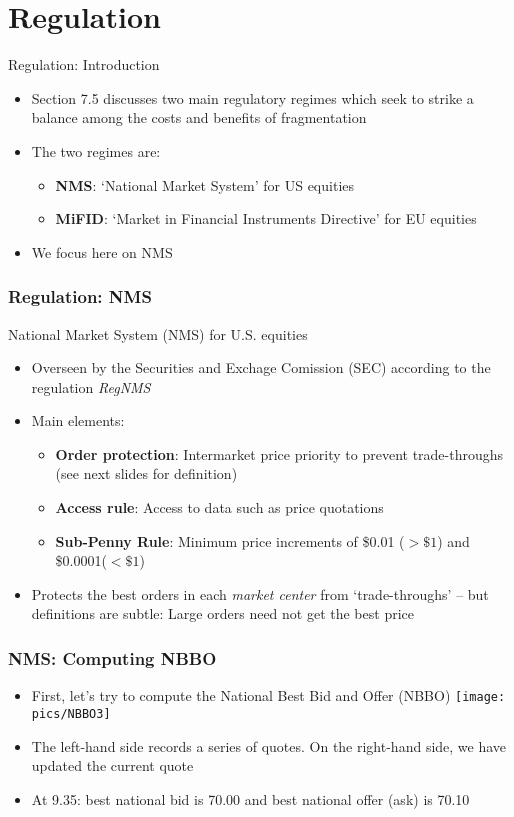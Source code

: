 \documentclass[english,10pt
,aspectratio=169
]{beamer}
\begin{document}
\section{Regulation}

\begin{frame}{Regulation: Introduction}
\begin{itemize}
\item Section 7.5 discusses two main regulatory regimes which seek to strike a balance among the costs and benefits of fragmentation
\item The two regimes are:
\begin{itemize}
\item \textbf{NMS}: `National Market System' for US equities
\item \textbf{MiFID}: `Market in Financial Instruments Directive' for EU equities
\end{itemize}
\item We focus here on NMS
\end{itemize}
\end{frame}


\begin{frame} \label{regulation}
\frametitle{Regulation: NMS}
 National Market System (NMS) for U.S. equities
\begin{itemize}
\item Overseen by the Securities and Exchage Comission (SEC) according to the regulation \textit{RegNMS}
\item Main elements:
\begin{itemize}
\item \textbf{Order protection}: Intermarket price priority to prevent trade-throughs (see next slides for definition)
\item \textbf{Access rule}: Access to data such as price quotations
\item \textbf{Sub-Penny Rule}: Minimum price increments of \$0.01 ($>\$1$) and \$0.0001($<\$1$)
\end{itemize}
\item Protects the best orders in each \textit{market center} from `trade-throughs' -- but definitions are subtle: Large orders need not get the best price
\end{itemize}
\end{frame}


\begin{frame}[label=protection]
\frametitle{NMS: Computing NBBO}
\begin{itemize}	
\item First, let's try to compute the National Best Bid and Offer (NBBO)
\texttt{[image: pics/NBBO3]}
\item The  left-hand side records a series of quotes. On the right-hand side, we have updated the current quote 
\pause
\item At 9.35: best national bid is 70.00 and best national offer (ask) is 70.10
\end{itemize}
\end{frame}
\end{document}
